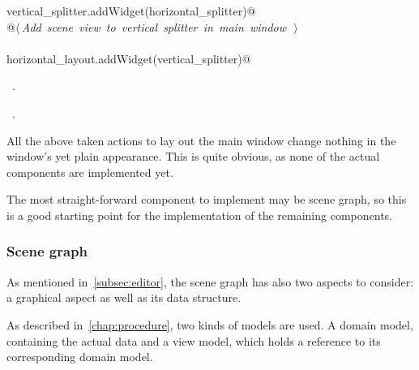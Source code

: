 \documentclass[
    a4paper,      %
    10pt,         %
    openright,    %
    notitlepage,  %
    parskip=half, %
]{scrreprt}       %
\theoremstyle{definition}                    %
\begin{document}
\begin{flushleft}
\begin{minipage}{\linewidth}
\begin{list}{}{}
\mbox{}\lstinline@    vertical_splitter.addWidget(horizontal_splitter)@\\
\mbox{}\lstinline@    @\hbox{$\langle\,${\itshape Add scene view to vertical splitter in main window}\nobreak\ {\footnotesize {}}$\,\rangle$}\lstinline@@\\
\mbox{}\lstinline@@\\
\mbox{}\lstinline@    horizontal_layout.addWidget(vertical_splitter)@\\
\mbox{}\lstinline@@{\NWsep}
\end{list}
\vspace{-1.5ex}
\footnotesize
\begin{list}{}{\setlength{\itemsep}{-\parsep}\setlength{\itemindent}{-\leftmargin}}
\item \NWtxtMacroDefBy\ .
\item \NWtxtMacroRefIn\ .

\item{}
\end{list}
\end{minipage}\vspace{4ex}
\end{flushleft}
All the above taken actions to lay out the main window change nothing in the
window's yet plain appearance. This is quite obvious, as none of the actual
components are implemented yet.

The most straight-forward component to implement may be scene graph, so this is
a good starting point for the implementation of the remaining components.

\subsubsection{Scene graph}
\label{ssubsec:scene-graph}

As mentioned in~\autoref{subsec:editor}, the scene graph has also two aspects to
consider: a graphical aspect as well as its data structure.


As described in~\autoref{chap:procedure}, two kinds of models are used. A domain
model, containing the actual data and a view model, which holds a reference to
its corresponding domain model.

% 
\end{document}
